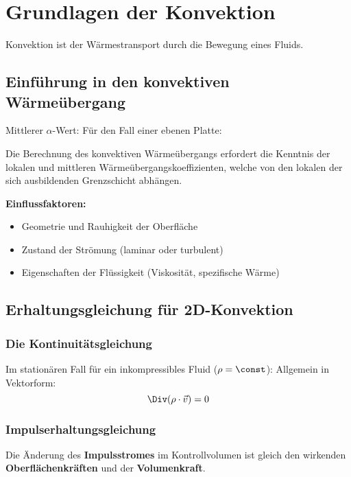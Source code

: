 
\section{Grundlagen der Konvektion} %
	Konvektion ist der Wärmestransport durch die Bewegung eines Fluids.
	
	\subsection{Einführung in den konvektiven Wärmeübergang} %
		Mittlerer $\alpha$-Wert:
		Für den Fall einer ebenen Platte:
		
		Die Berechnung des konvektiven Wärmeübergangs erfordert die Kenntnis der lokalen und mittleren Wärmeübergangskoeffizienten, welche von den lokalen der sich ausbildenden Grenzschicht abhängen.
		
		\textbf{Einflussfaktoren:}
		\begin{itemize}
			\item Geometrie und Rauhigkeit der Oberfläche
			\item Zustand der Strömung (laminar oder turbulent)
			\item Eigenschaften der Flüssigkeit (Viskosität, spezifische Wärme)
		\end{itemize}
	
	\subsection{Erhaltungsgleichung für 2D-Konvektion} %
		\subsubsection{Die Kontinuitätsgleichung} %
			Im stationären Fall für ein inkompressibles Fluid ($\rho = \const$):
			Allgemein in Vektorform:
			\[
				\Div(\rho \cdot \vec v) = 0
			\]
		\subsubsection{Impulserhaltungsgleichung} %
			 Die Änderung des \textbf{Impulsstromes} im Kontrollvolumen ist gleich den wirkenden \textbf{Oberflächenkräften} und der \textbf{Volumenkraft}.
			
